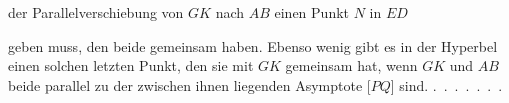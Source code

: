 %
der Parallelverschiebung von $GK$ nach $AB$ einen  Punkt $N$ in $ED$
\begin{center}\end{center}
\noindent geben muss, den beide gemeinsam haben. Ebenso wenig gibt es in der Hyperbel einen solchen letzten Punkt, den sie mit $GK$ gemeinsam hat, wenn $GK$ und $AB$ beide parallel zu der zwischen ihnen liegenden Asymptote [$PQ$] sind. \mbox{.\ .\ .\ .\ .\ .\ .}
